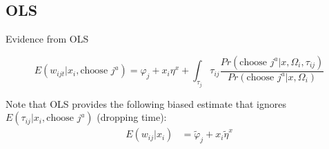\documentclass[table,10pt]{beamer}
\begin{document}
\begin{frame}





\medskip


\end{frame}


\subsection{OLS}
\begin{frame}{Evidence from  OLS   }

\begin{equation*}
E( w_{ijt}|x_{i},\text{choose } j^a)= \varphi_{j}+ x_{i}\eta^x +  \int_{\tau_j} \tau_{ij} \frac{Pr(\textrm{choose } j^a | x,\Omega_i,\tau_{ij}) }{Pr(\textrm{choose }j^a |x,\Omega_i)}
\end{equation*}
\medskip

Note that OLS provides the following biased estimate that ignores  $E(\tau_{ij}|x_{i},\text{choose } j^a)$ (dropping time):
\begin{align*}
E( w_{ij}|x_{i}) &= \tilde{\varphi}_{j} + x_{i} \tilde{\eta}^x\\
\end{align*}




\end{frame}
\end{document}
